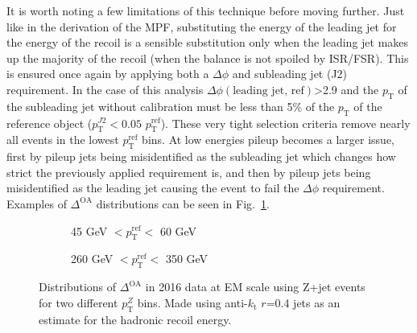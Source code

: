 It is worth noting a few limitations of this technique before moving further.  
Just like in the derivation of the MPF, substituting the energy of the leading jet for the energy of the recoil is a sensible substitution only when the leading jet makes up the majority of the recoil (when the balance is not spoiled by ISR/FSR).  
This is ensured once again by applying both a $\Delta\phi$ and subleading jet (J2) requirement.  
In the case of this analysis $\Delta\phi\left(\text{leading jet, ref}\right)$>2.9 and the $p_{\mathrm T}$ of the subleading jet without calibration must be less than 5\% of the $p_{\mathrm T}$ of the reference object ($p_{\mathrm T}^{J2}<0.05$ $p_{\mathrm T}^{\mathrm{ref}}$).  
These very tight selection criteria remove nearly all events in the lowest $p_{\mathrm T}^{\mathrm {ref}}$ bins.  
At low energies pileup becomes a larger issue, first by pileup jets being misidentified as the subleading jet which changes how strict the previously applied requirement is, and then by pileup jets being misidentified as the leading jet causing the event to fail the $\Delta\phi$ requirement.  
Examples of $\Delta^{\mathrm {OA}}$ distributions can be seen in Fig.~\ref{Fig:OADistExample}.  

\begin{figure}[!ht]
  \centering
  \begin{subfigure}{.5\textwidth}
    \centering
    \caption{45 GeV $< p_{\mathrm{T}}^{\mathrm{ref}} < $ 60 GeV}
  \end{subfigure}%
  \begin{subfigure}{.5\textwidth}  \centering
    \caption{260 GeV $< p_{\mathrm{T}}^{\mathrm{ref}} < $ 350 GeV}
  \end{subfigure}
 \caption[Example $\Delta^{\mathrm{OA}}$ distributions]
 {\small Distributions of $\Delta^{\mathrm{OA}}$ in 2016 data at EM scale using Z+jet events for two different $p_{\mathrm T}^Z$ bins.  Made using anti-$k_{\mathrm t}$ $r$=0.4 jets as an estimate for the hadronic recoil energy.  }
 \label{Fig:OADistExample}
\end{figure}



